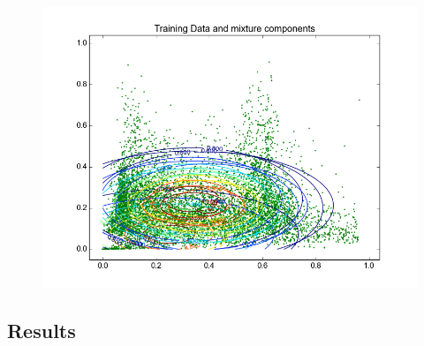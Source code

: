 \documentclass[11pt,a4paper]{article}
\begin{document}
\begin{minipage}[b]{0.25\textwidth}
\begin{figure}[H]
  \centering
  \includegraphics[width=.8\linewidth]{Figures/contours_diagstreet30.png}

  \label{fig:sfig1}
\end{figure}%
\end{minipage}
\subsection{Results}
\end{document}
